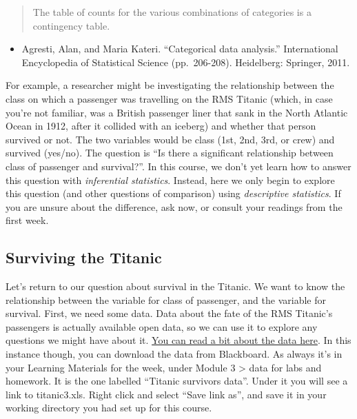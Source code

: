 \documentclass[
]{book}
\providecommand{\tightlist}{%
  \setlength{\itemsep}{0pt}\setlength{\parskip}{0pt}}
\begin{document}
\begin{quote}
The table of counts for the various combinations of categories is a contingency table.
\end{quote}

\begin{itemize}
\tightlist
\item
  Agresti, Alan, and Maria Kateri. ``Categorical data analysis.'' International Encyclopedia of Statistical Science (pp.~206-208). Heidelberg: Springer, 2011.
\end{itemize}

For example, a researcher might be investigating the relationship between the class on which a passenger was travelling on the RMS Titanic (which, in case you're not familiar, was a British passenger liner that sank in the North Atlantic Ocean in 1912, after it collided with an iceberg) and whether that person survived or not. The two variables would be class (1st, 2nd, 3rd, or crew) and survived (yes/no). The question is ``Is there a significant relationship between class of passenger and survival?''. In this course, we don't yet learn how to answer this question with \emph{inferential statistics}. Instead, here we only begin to explore this question (and other questions of comparison) using \emph{descriptive statistics}. If you are unsure about the difference, ask now, or consult your readings from the first week.

\hypertarget{surviving-the-titanic}{%
\subsection{Surviving the Titanic}\label{surviving-the-titanic}}

Let's return to our question about survival in the Titanic. We want to know the relationship between the variable for class of passenger, and the variable for survival. First, we need some data. Data about the fate of the RMS Titanic's passengers is actually available open data, so we can use it to explore any questions we might have about it. \href{https://www.statisticalconsultants.co.nz/blog/titanic-survival-data.html}{You can read a bit about the data here}. In this instance though, you can download the data from Blackboard. As always it's in your Learning Materials for the week, under Module 3 \textgreater{} data for labs and homework. It is the one labelled ``Titanic survivors data''. Under it you will see a link to titanic3.xls. Right click and select ``Save link as'', and save it in your working directory you had set up for this course.
\end{document}

